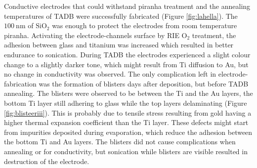 \documentclass[final]{jyflluk}
\begin{document}
Conductive electrodes that could withstand piranha treatment and the annealing temperatures of TADB were successfully fabricated (Figure \ref{fig:lahella}). The $\SI{100}{\nano \metre}$ of $\mathrm{SiO_2}$ was enough to protect the electrodes from room temperature piranha. Activating the electrode-channels surface by RIE $\mathrm{O_2}$ treatment, the adhesion between glass and titanium was increased which resulted in better endurance to sonication. During TADB the electrodes experienced a slight colour change to a slightly darker tone, which might result from Ti diffusion to Au, but no change in conductivity was observed. The only complication left in electrode-fabrication was the formation of blisters days after deposition, but before TADB annealing.  The blisters were observed to be between the Ti and the Au layers, the bottom Ti layer still adhering to glass while the top layers delaminating (Figure \ref{fig:blisteeriii}). This is probably due to tensile stress resulting from gold having a higher thermal expansion coefficient than the Ti layer. These defects might start from impurities deposited during evaporation, which reduce the adhesion between the bottom Ti and Au layers. The blisters did not cause complications when annealing or for conductivity, but sonication while blisters are visible resulted in destruction of the electrode.
\end{document}
